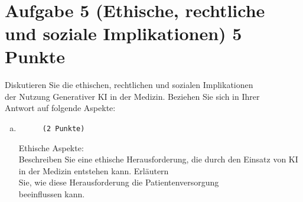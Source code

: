 \documentclass[12pt, ngerman]{AssignmentClass}
\begin{document}
    \begin{answerbox}
		\noindent
		\fbox{\parbox[c]{\textwidth}{
				\vspace{10cm}
				\hspace{\textwidth}
		}}\\
	\end{answerbox}

\section*{Aufgabe 5 (Ethische, rechtliche und soziale Implikationen) \hfill 5 Punkte}
    Diskutieren Sie die ethischen, rechtlichen und sozialen Implikationen\\
    der Nutzung Generativer KI in der Medizin. Beziehen Sie sich in Ihrer\\
    Antwort auf folgende Aspekte:

    \begin{enumerate}[a)]
		\item 
			\begin{minipage}[t]{\linewidth}
				\vspace{-0.61em}
				\begin{figure} 
					\raggedleft
					\texttt{(2 Punkte)}
				\end{figure}
                Ethische Aspekte:\\
                Beschreiben Sie eine ethische Herausforderung, die durch den Einsatz von KI in der Medizin entstehen kann. Erläutern\\
                Sie, wie diese Herausforderung die Patientenversorgung\\
                beeinflussen kann.
			\end{minipage}
	\end{enumerate}
 
	\begin{solution}
		\noindent
		\\
	\end{solution}
\end{document}
